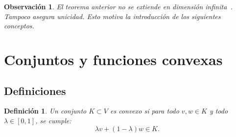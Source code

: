 \documentclass[12pt]{book}
\newtheorem{definition}{Definición}
\newtheorem{remark}{Observación}
\theoremstyle{definition}
\theoremstyle{plain}
\theoremstyle{remark}
\begin{document}
\begin{remark}
El teorema anterior no se extiende en dimensión infinita~\cite{allaire2007}. Tampoco asegura unicidad. Esto motiva la introducción de los siguientes conceptos.
\end{remark}




\section{Conjuntos y funciones convexas} %


\subsection{Definiciones}

\begin{definition}
Un conjunto $K \subset V$ es \emph{convexo} si para todo $v, w \in K$ y todo $\lambda \in [0, 1]$, se cumple:
\begin{equation}
    \label{def:convexo}
    \lambda v + (1 - \lambda) w \in K.
\end{equation}
\end{definition}
\end{document}
